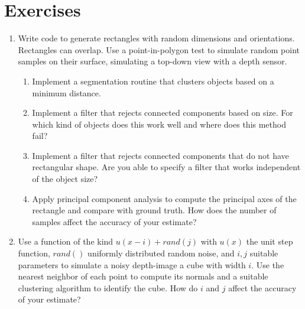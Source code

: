 \section*{Exercises}
\begin{enumerate}
\item Write code to generate rectangles with random dimensions and orientations. Rectangles can overlap. Use a point-in-polygon test to simulate random point samples on their surface, simulating a top-down view with a depth sensor.
\begin{enumerate}
\item Implement a segmentation routine that clusters objects based on a minimum distance.
\item Implement a filter that rejects connected components based on size. For which kind of objects does this work well and where does this method fail?
\item Implement a filter that rejects connected components that do not have rectangular shape. Are you able to specify a filter that works independent of the object size?
\item Apply principal component analysis to compute the principal axes of the rectangle and compare with ground truth. How does the number of samples affect the accuracy of your estimate?
\end{enumerate}
\item Use a function of the kind $u(x-i)+rand(j)$ with $u(x)$ the unit step function, $rand()$ uniformly distributed random noise, and $i,j$ suitable parameters to simulate a noisy depth-image a cube with width $i$. Use the nearest neighbor of each point to compute its normals and a suitable clustering algorithm to identify the cube. How do $i$ and $j$ affect the accuracy of your estimate?
\end{enumerate}
